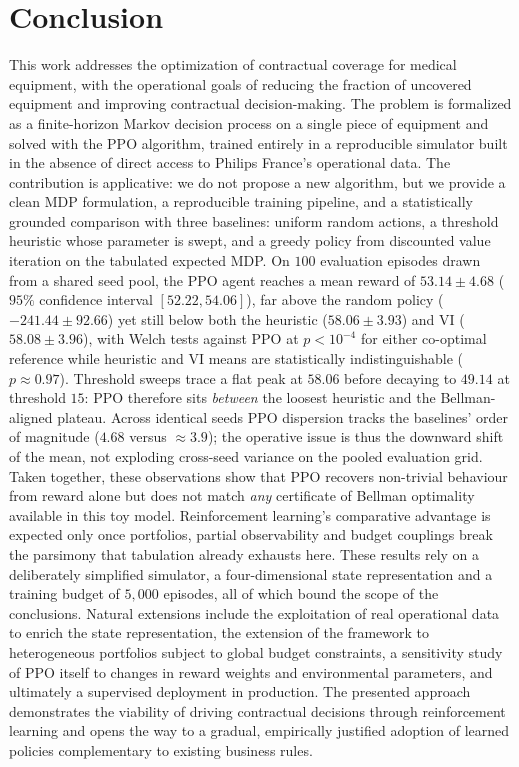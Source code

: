 \section{Conclusion}
\label{sec:conclusion}

This work addresses the optimization of contractual coverage for medical
equipment, with the operational goals of reducing the fraction of
uncovered equipment and improving contractual decision-making. The
problem is formalized as a finite-horizon Markov decision process on a
single piece of equipment and solved with the PPO algorithm, trained
entirely in a reproducible simulator built in the absence of direct
access to Philips France's operational data. The contribution is
applicative: we do not propose a new algorithm, but we provide a clean
MDP formulation, a reproducible training pipeline, and a statistically
grounded comparison with three baselines: uniform random actions, a
threshold heuristic whose parameter is swept, and a greedy policy from
discounted value iteration on the tabulated expected MDP.
On $100$ evaluation episodes drawn from a shared seed pool, the PPO
agent reaches a mean reward of $53.14 \pm 4.68$ ($95\%$ confidence
interval $[52.22, 54.06]$), far above the random policy
($-241.44 \pm 92.66$) yet still below both the heuristic
($58.06 \pm 3.93$) and VI ($58.08 \pm 3.96$), with Welch tests against PPO at
$p < 10^{-4}$ for either co-optimal reference while heuristic and VI means are
statistically indistinguishable ($p \approx 0.97$). Threshold sweeps trace a
flat peak at $58.06$ before decaying to $49.14$ at threshold $15$: PPO therefore
sits \emph{between} the loosest heuristic and the Bellman-aligned plateau.
Across identical seeds PPO dispersion tracks the baselines' order of magnitude
($4.68$ versus $\approx 3.9$); the operative issue is thus the downward shift
of the mean, not exploding cross-seed variance on the pooled evaluation grid.
Taken together, these observations show that PPO recovers non-trivial behaviour
from reward alone but does not match \emph{any} certificate of Bellman optimality
available in this toy model. Reinforcement learning's comparative advantage is
expected only once portfolios, partial observability and budget couplings break
the parsimony that tabulation already exhausts here.
These results rely on a deliberately simplified simulator, a
four-dimensional state representation and a training budget of $5{,}000$
episodes, all of which bound the scope of the conclusions.
Natural extensions include the exploitation of real operational data to
enrich the state representation, the extension of the framework to
heterogeneous portfolios subject to global budget constraints, a
sensitivity study of PPO itself to changes in reward weights and
environmental parameters, and ultimately a supervised deployment in
production.
The presented approach demonstrates the viability of driving contractual
decisions through reinforcement learning and opens the way to a
gradual, empirically justified adoption of learned policies
complementary to existing business rules.
